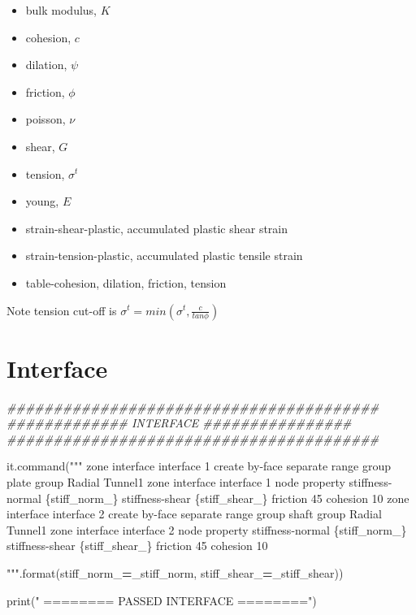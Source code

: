 \documentclass[a4paper, nobind]{templates/ociamthesis}
\providecommand{\tightlist}{%
  \setlength{\itemsep}{0pt}\setlength{\parskip}{0pt}}
\newenvironment{Shaded}{\begin{snugshade}}{\end{snugshade}}
\newcommand{\BuiltInTok}[1]{#1}
\newcommand{\CommentTok}[1]{\textcolor[rgb]{0.56,0.35,0.01}{\textit{#1}}}
\newcommand{\NormalTok}[1]{#1}
\newcommand{\OperatorTok}[1]{\textcolor[rgb]{0.81,0.36,0.00}{\textbf{#1}}}
\newcommand{\SpecialCharTok}[1]{\textcolor[rgb]{0.00,0.00,0.00}{#1}}
\newcommand{\StringTok}[1]{\textcolor[rgb]{0.31,0.60,0.02}{#1}}
\renewenvironment{Shaded}
{
  \vspace{10pt}%
  \begin{snugshade}%
}{%
  \end{snugshade}%
  \vspace{8pt}%
}
\begin{document}
\begin{itemize}
\tightlist
\item
  bulk modulus, \(K\)
\item
  cohesion, \(c\)
\item
  dilation, \(\psi\)
\item
  friction, \(\phi\)
\item
  poisson, \(\nu\)
\item
  shear, \(G\)
\item
  tension, \(\sigma^{t}\)
\item
  young, \(E\)
\item
  strain-shear-plastic, accumulated plastic shear strain
\item
  strain-tension-plastic, accumulated plastic tensile strain
\item
  table-cohesion, dilation, friction, tension
\end{itemize}

Note tension cut-off is \(\sigma^{t} = min(\sigma^{t}, \frac{c}{tan\phi})\)

\hypertarget{interface}{%
\section{Interface}\label{interface}}

\begin{Shaded}
\begin{Highlighting}[]
\CommentTok{\#\#\#\#\#\#\#\#\#\#\#\#\#\#\#\#\#\#\#\#\#\#\#\#\#\#\#\#\#\#\#\#\#\#\#\#\#\#\#\#}
\CommentTok{\#\#\#\#\#\#\#\#\#\#\#\#\# INTERFACE \#\#\#\#\#\#\#\#\#\#\#\#\#\#\#\#}
\CommentTok{\#\#\#\#\#\#\#\#\#\#\#\#\#\#\#\#\#\#\#\#\#\#\#\#\#\#\#\#\#\#\#\#\#\#\#\#\#\#\#\#}

\NormalTok{it.command(}\StringTok{"""}
\StringTok{zone interface \textquotesingle{}interface 1\textquotesingle{} create by{-}face separate range group \textquotesingle{}plate\textquotesingle{} group \textquotesingle{}Radial Tunnel1\textquotesingle{}}
\StringTok{zone interface \textquotesingle{}interface 1\textquotesingle{} node property stiffness{-}normal }\SpecialCharTok{\{stiff\_norm\_\}}\StringTok{ stiffness{-}shear }\SpecialCharTok{\{stiff\_shear\_\}}\StringTok{ friction 45 cohesion 10}
\StringTok{zone interface \textquotesingle{}interface 2\textquotesingle{} create by{-}face separate range group \textquotesingle{}shaft\textquotesingle{} group \textquotesingle{}Radial Tunnel1\textquotesingle{}}
\StringTok{zone interface \textquotesingle{}interface 2\textquotesingle{} node property stiffness{-}normal }\SpecialCharTok{\{stiff\_norm\_\}}\StringTok{ stiffness{-}shear }\SpecialCharTok{\{stiff\_shear\_\}}\StringTok{ friction 45 cohesion 10}

\StringTok{"""}\NormalTok{.}\BuiltInTok{format}\NormalTok{(stiff\_norm\_}\OperatorTok{=}\NormalTok{\_stiff\_norm, stiff\_shear\_}\OperatorTok{=}\NormalTok{\_stiff\_shear))}

\BuiltInTok{print}\NormalTok{(}\StringTok{"               ======== PASSED INTERFACE ========"}\NormalTok{)}
\end{Highlighting}
\end{Shaded}
\end{document}
